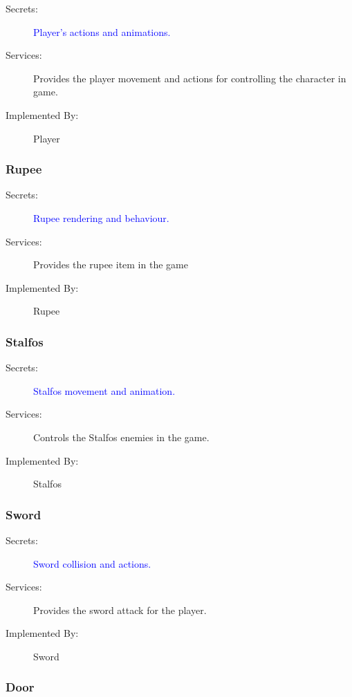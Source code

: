 \documentclass[12pt, titlepage]{article}
\begin{document}
\begin{description}
  \item[Secrets:] \textcolor{blue}{Player's actions and animations.}
  \item[Services:] Provides the player movement and actions for controlling the character in game.
  \item[Implemented By:] Player
\end{description}

\subsubsection{Rupee}

\begin{description}
  \item[Secrets:] \textcolor{blue}{Rupee rendering and behaviour.}
  \item[Services:] Provides the rupee item in the game
  \item[Implemented By:] Rupee
\end{description}

\subsubsection{Stalfos}

\begin{description}
  \item[Secrets:] \textcolor{blue}{Stalfos movement and animation.}
  \item[Services:] Controls the Stalfos enemies in the game. 
  \item[Implemented By:] Stalfos
\end{description}

\subsubsection{Sword}

\begin{description}
  \item[Secrets:] \textcolor{blue}{Sword collision and actions.}
  \item[Services:] Provides the sword attack for the player.
  \item[Implemented By:] Sword
\end{description}

\subsubsection{Door}
\end{document}
